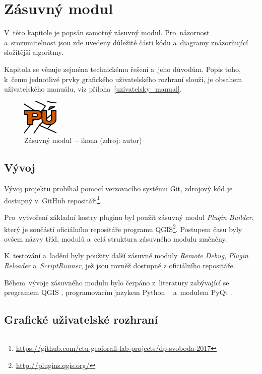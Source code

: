 \chapter{Zásuvný modul}
\label{plugin}

V~této kapitole je popsán samotný zásuvný modul. Pro~názornost
a~srozumitelnost jsou zde uvedeny důležité části kódu a~diagramy
znázorňující složitější algoritmy.

Kapitola se věnuje zejména technickému řešení a~jeho důvodům. Popis
toho, k~čemu jednotlivé prvky grafického uživatelského rozhraní
slouží, je obsahem uživatelského manuálu, viz
příloha~\ref{uzivatelsky_manual}.

	\begin{figure}[H] \centering
		\includegraphics[width=.1\textwidth]{./pictures/puplugin.png}
		\caption[Zásuvný modul~– ikona]{Zásuvný modul~– ikona (zdroj: autor)}
		\label{fig:ikona_pluginu}
 	\end{figure}

\section{Vývoj}
\label{vyvoj}

Vývoj projektu probíhal pomocí verzovacího systému
Git, zdrojový kód je dostupný
v~GitHub repositáři\footnote{\url{https://github.com/ctu-geoforall-lab-projects/dp-svoboda-2017}}.

Pro~vytvoření základní kostry pluginu byl použit zásuvný modul
\textit{Plugin Builder}, který je součástí oficiálního repositáře
programu QGIS\footnote{\label{oficialni_repositar_qgis}\url{http://plugins.qgis.org/}}. Postupem času
byly ovšem názvy tříd, modulů a~celá struktura zásuvného modulu
změněny.

K~testování a~ladění byly použity další zásuvné moduly \textit{Remote
Debug}, \textit{Plugin Reloader} a~\textit{ScriptRunner}, jež jsou rovněž
dostupné z oficiálního repositáře.

Během~vývoje zásuvného modulu bylo čerpáno z~literatury zabývající se
programem QGIS \citep{pyqgis_book}, programovacím jazykem Python
\citep{python3_oop_book}~\citep{dive_into_python} a~modulem PyQt
\citep{pyqt_book}.

\section{Grafické uživatelské rozhraní}
\label{gui}


